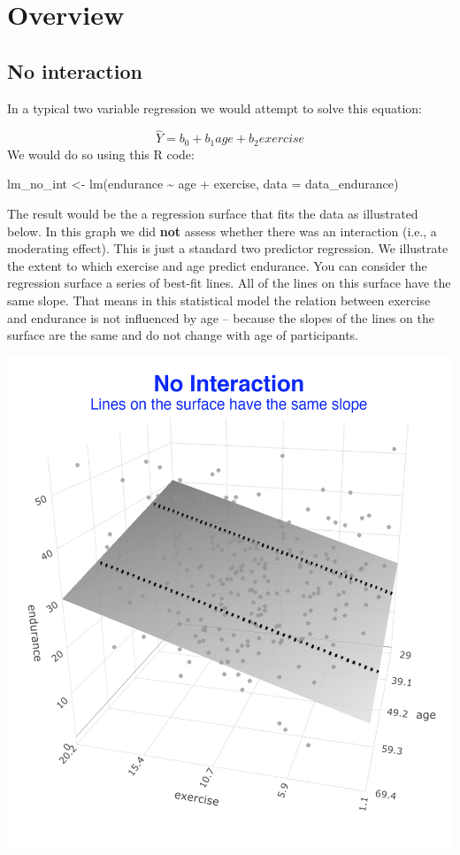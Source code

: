 \documentclass[
]{krantz}
\makeatletter
\newenvironment{Shaded}{\begin{snugshade}}{\end{snugshade}}
\newcommand{\AttributeTok}[1]{\textcolor[rgb]{0.61,0.61,0.61}{#1}}
\newcommand{\FunctionTok}[1]{\textcolor[rgb]{0,0,0}{#1}}
\newcommand{\NormalTok}[1]{#1}
\newcommand{\OtherTok}[1]{\textcolor[rgb]{0.37,0.37,0.37}{#1}}
\newcommand{\SpecialCharTok}[1]{\textcolor[rgb]{0,0,0}{#1}}
\newenvironment{kframe}{%
\medskip{}
\setlength{\fboxsep}{.8em}
 \def\at@end@of@kframe{}%
 \ifinner\ifhmode%
  \def\at@end@of@kframe{\end{minipage}}%
  \begin{minipage}{\columnwidth}%
 \fi\fi%
 \def\FrameCommand##1{\hskip\@totalleftmargin \hskip-\fboxsep
 \colorbox{shadecolor}{##1}\hskip-\fboxsep
     \hskip-\linewidth \hskip-\@totalleftmargin \hskip\columnwidth}%
 \MakeFramed {\advance\hsize-\width
   \@totalleftmargin\z@ \linewidth\hsize
   \@setminipage}}%
 {\par\unskip\endMakeFramed%
 \at@end@of@kframe}
\renewenvironment{Shaded}{\begin{kframe}}{\end{kframe}}
\makeatother
\begin{document}
\hypertarget{overview-9}{%
\section{Overview}\label{overview-9}}

\hypertarget{no-interaction}{%
\subsection{No interaction}\label{no-interaction}}

In a typical two variable regression we would attempt to solve this equation:

\[ \hat{Y} = b_0 + b_1age + b_2exercise \]
We would do so using this R code:

\begin{Shaded}
\begin{Highlighting}[]
\NormalTok{lm\_no\_int }\OtherTok{\textless{}{-}} \FunctionTok{lm}\NormalTok{(endurance }\SpecialCharTok{\textasciitilde{}}\NormalTok{ age }\SpecialCharTok{+}\NormalTok{ exercise,}
                \AttributeTok{data =}\NormalTok{ data\_endurance)}
\end{Highlighting}
\end{Shaded}

The result would be the a regression surface that fits the data as illustrated below. In this graph we did \textbf{not} assess whether there was an interaction (i.e., a moderating effect). This is just a standard two predictor regression. We illustrate the extent to which exercise and age predict endurance. You can consider the regression surface a series of best-fit lines. All of the lines on this surface have the same slope. That means in this statistical model the relation between exercise and endurance is not influenced by age -- because the slopes of the lines on the surface are the same and do not change with age of participants.

\includegraphics[width=0.35\linewidth]{ch_mmr/images/mmr_no_int}
\end{document}
